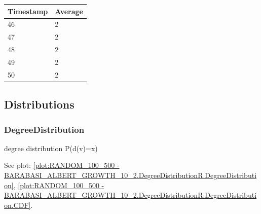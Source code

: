 \begin{tabular}{|l||l|}
\hline
	\textbf{Timestamp} & \textbf{Average} \\ \hline
	46 & 2 \\ \hline
	47 & 2 \\ \hline
	48 & 2 \\ \hline
	49 & 2 \\ \hline
	50 & 2 \\ \hline
\end{tabular}


\subsection{Distributions}
\subsubsection{DegreeDistribution}
degree distribution P(d(v)=x)

See plot: \ref{plot:RANDOM_100_500 - BARABASI_ALBERT_GROWTH_10_2.DegreeDistributionR.DegreeDistribution}, \ref{plot:RANDOM_100_500 - BARABASI_ALBERT_GROWTH_10_2.DegreeDistributionR.DegreeDistribution.CDF}.

%
%

